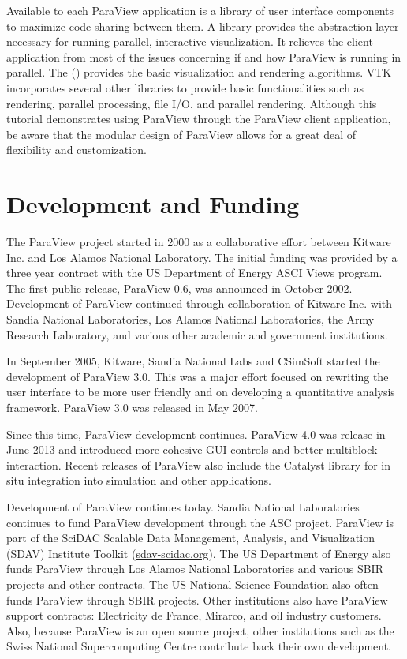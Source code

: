 Available to each ParaView application is a library of user interface
components to maximize code sharing between them.  A  library provides the abstraction layer necessary for running
parallel, interactive visualization.  It relieves the client application
from most of the issues concerning if and how ParaView is running in
parallel.  The  () provides the
basic visualization and rendering algorithms.  VTK incorporates several
other libraries to provide basic functionalities such as rendering,
parallel processing, file I/O, and parallel rendering.  Although this
tutorial demonstrates using ParaView through the ParaView client
application, be aware that the modular design of ParaView allows for a
great deal of flexibility and customization.

\section{Development and Funding}

The ParaView project started in 2000 as a collaborative effort between
Kitware Inc. and Los Alamos National Laboratory. The initial funding was
provided by a three year contract with the US Department of Energy ASCI
Views program.  The first public release, ParaView 0.6, was announced in
October 2002.  Development of ParaView continued through collaboration of
Kitware Inc. with Sandia National Laboratories, Los Alamos National
Laboratories, the Army Research Laboratory, and various other academic and
government institutions.

In September 2005, Kitware, Sandia National Labs and CSimSoft started the
development of ParaView 3.0. This was a major effort focused on rewriting
the user interface to be more user friendly and on developing a
quantitative analysis framework. ParaView 3.0 was released in May 2007.

Since this time, ParaView development continues. ParaView 4.0 was release
in June 2013 and introduced more cohesive GUI controls and better
multiblock interaction. Recent releases of ParaView also include the
Catalyst library for in situ integration into simulation and other
applications.

Development of ParaView continues today.  Sandia National Laboratories
continues to fund ParaView development through the ASC project.  ParaView
is part of the SciDAC Scalable Data Management, Analysis, and Visualization
(SDAV) Institute Toolkit (\href{http://sdav-scidac.org}{sdav-scidac.org}).
The US Department of Energy also funds ParaView through Los Alamos National
Laboratories and various SBIR projects and other contracts.  The US
National Science Foundation also often funds ParaView through SBIR
projects.  Other institutions also have ParaView support contracts:
Electricity de France, Mirarco, and oil industry customers.  Also, because
ParaView is an open source project, other institutions such as the Swiss
National Supercomputing Centre contribute back their own development.

